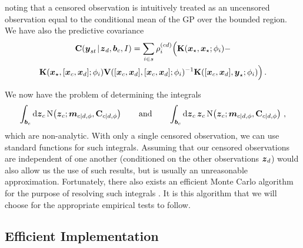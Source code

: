 \documentclass{acmsmall}
\begin{document}
noting that a censored observation is intuitively treated as an uncensored observation equal to the conditional mean of the GP over the bounded region. We have also the predictive covariance
\begin{multline*} %
\covsub{\vy}{st}{\vzD,\vect{b}_c,I}=\sum_{i\in s}\rho^{(cd)}_i \Big(\mat{K}(\vxst,\vxst;\phi_i)-\\\mat{K}(\vxst,[\vx_c,\vxD];\phi_i)\mat{V}([\vx_c,\vxD],[\vx_c,\vxD];\phi_i)^{-1}\mat{K}([\vx_c,\vxD],\vyst;\phi_i)\Big)\,.
\end{multline*}

We now have the problem of determining the integrals 
\begin{equation*} %
\int_{\vect{b}_c}\ud\vz_c\,\N{\vz_c}{\vect{m}_{c|d,\phi}}{\mat{C}_{c|d,\phi}} \qquad \text{and} \qquad
\int_{\vect{b}_c}\ud\vz_c\,\vz_c\, \N{\vz_c}{\vect{m}_{c|d,\phi}}{\mat{C}_{c|d,\phi}}\,,
\end{equation*}
which are non-analytic. With only a single censored observation, we can use standard functions for such integrals. Assuming that our censored observations are independent of one another (conditioned on the other observations $\boldsymbol{z}_d$) would also allow us the use of such results, but is usually an unreasonable approximation. Fortunately, there also exists an efficient Monte Carlo algorithm  for the purpose of resolving such integrals \cite{genz1992ncm}. It is this algorithm that we will choose for the appropriate empirical tests to follow.

\subsection{Efficient Implementation}\label{sec_efficient}
\end{document}
